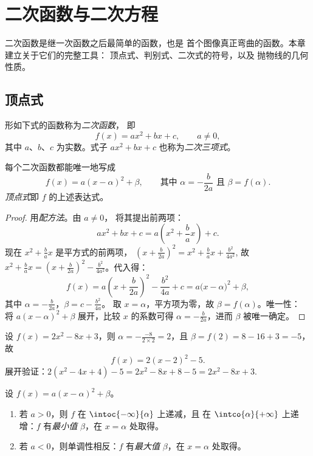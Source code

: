 \chapter{二次函数与二次方程}\label{ch:g11:quad}

二次函数是继一次函数之后最简单的函数，也是
首个图像真正弯曲的函数。本章建立关于它们的完整工具：
顶点式、判别式、二次式的符号，以及
抛物线的几何性质。

\section{顶点式}

\begin{definition}[二次函数]\label{def:g11:quad:quadratic}
形如下式的函数称为\emph{二次函数}，
即
\[
f(x) = ax^2 + bx + c, \qquad a \neq 0,
\]
其中 $a$、$b$、$c$ 为实数。式子 $ax^2 + bx + c$
也称为\emph{二次三项式}。
\end{definition}

\begin{theorem}[顶点式]\label{thm:g11:quad:canonical}
每个二次函数都能唯一地写成
\[
f(x) = a(x - \alpha)^2 + \beta,
\qquad\text{其中 } \alpha = -\frac{b}{2a} \text{ 且 } \beta = f(\alpha).
\]
\emph{顶点式}即 $f$ 的上述表达式。
\end{theorem}

\begin{proof}
用\emph{配方法}。由 $a \neq 0$，
将其提出前两项：
\[
ax^2 + bx + c = a\left(x^2 + \frac{b}{a}x\right) + c .
\]
现在 $x^2 + \frac{b}{a}x$ 是平方式的前两项，
$\left(x + \frac{b}{2a}\right)^2 = x^2 + \frac ba x + \frac{b^2}{4a^2}$,
故 $x^2 + \frac{b}{a}x = \left(x + \frac{b}{2a}\right)^2 -
\frac{b^2}{4a^2}$。代入得：
\[
f(x) = a\left(x + \frac{b}{2a}\right)^2 - \frac{b^2}{4a} + c
= a\bigl(x - \alpha\bigr)^2 + \beta,
\]
其中 $\alpha = -\frac{b}{2a}$，$\beta = c - \frac{b^2}{4a}$。
取 $x = \alpha$，平方项为零，故 $\beta = f(\alpha)$。唯一性：
将 $a(x-\alpha)^2 + \beta$ 展开，比较
$x$ 的系数可得 $\alpha = -\frac{b}{2a}$，进而 $\beta$ 被唯一确定。
\end{proof}

\begin{example}\label{ex:g11:quad:canonical}
设 $f(x) = 2x^2 - 8x + 3$，则 $\alpha = -\frac{-8}{2 \times 2} = 2$，且
$\beta = f(2) = 8 - 16 + 3 = -5$，故
\[
f(x) = 2(x - 2)^2 - 5 .
\]
展开验证：$2(x^2 - 4x + 4) - 5 = 2x^2 - 8x + 8 - 5 =
2x^2 - 8x + 3$.
\end{example}

\begin{proposition}[极值与单调性]\label{prop:g11:quad:variations}
设 $f(x) = a(x-\alpha)^2 + \beta$。
\begin{enumerate}
  \item 若 $a > 0$，则 $f$ 在 $\intoc{-\infty}{\alpha}$ 上递减，且
        在 $\intco{\alpha}{+\infty}$ 上递增：$f$ 有\emph{最小值}
        $\beta$，在 $x = \alpha$ 处取得。
  \item 若 $a < 0$，则单调性相反：$f$ 有\emph{最大值}
        $\beta$，在 $x = \alpha$ 处取得。
\end{enumerate}
\end{proposition}

